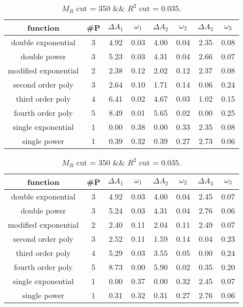  
\begin{table}[H] 
\begin{center} 
\begin{tabular}{|c|c|cc|cc|cc|} 
\hline function & \#P & $\Delta A_1$ & $\omega_1$ & $\Delta A_2$ & $\omega_2$ & $\Delta A_3$ & $\omega_3$ \\ \hline 
double exponential &  3 &   4.92 &   0.03 &   4.00 &   0.04 &   2.35 &   0.08 \\ 
double power &  3 &   5.23 &   0.03 &   4.31 &   0.04 &   2.66 &   0.07 \\ 
modified exponential &  2 &   2.38 &   0.12 &   2.02 &   0.12 &   2.37 &   0.08 \\ 
second order poly &  3 &   2.64 &   0.10 &   1.71 &   0.14 &   0.06 &   0.24 \\ 
third order poly &  4 &   6.41 &   0.02 &   4.67 &   0.03 &   1.02 &   0.15 \\ 
fourth order poly &  5 &   8.49 &   0.01 &   5.65 &   0.02 &   0.00 &   0.25 \\ 
single exponential &  1 &   0.00 &   0.38 &   0.00 &   0.33 &   2.35 &   0.08 \\ 
single power &  1 &   0.39 &   0.32 &   0.39 &   0.27 &   2.73 &   0.06 \\ 
\hline 
\end{tabular} 
\caption{$M_R$ cut = 350 \&\& $R^2$ cut = 0.035.} 
\label{tab:FitChoices_350_0.035} 
\end{center} 
\end{table} 
 
 
\begin{table}[H] 
\begin{center} 
\begin{tabular}{|c|c|cc|cc|cc|} 
\hline function & \#P & $\Delta A_1$ & $\omega_1$ & $\Delta A_2$ & $\omega_2$ & $\Delta A_3$ & $\omega_3$ \\ \hline 
double exponential &  3 &   4.92 &   0.03 &   4.00 &   0.04 &   2.45 &   0.07 \\ 
double power &  3 &   5.24 &   0.03 &   4.31 &   0.04 &   2.76 &   0.06 \\ 
modified exponential &  2 &   2.40 &   0.11 &   2.04 &   0.11 &   2.49 &   0.07 \\ 
second order poly &  3 &   2.52 &   0.11 &   1.59 &   0.14 &   0.04 &   0.23 \\ 
third order poly &  4 &   5.29 &   0.03 &   3.55 &   0.05 &   0.00 &   0.24 \\ 
fourth order poly &  5 &   8.73 &   0.00 &   5.90 &   0.02 &   0.35 &   0.20 \\ 
single exponential &  1 &   0.00 &   0.37 &   0.00 &   0.32 &   2.45 &   0.07 \\ 
single power &  1 &   0.31 &   0.32 &   0.31 &   0.27 &   2.76 &   0.06 \\ 
\hline 
\end{tabular} 
\caption{$M_R$ cut = 350 \&\& $R^2$ cut = 0.035.} 
\label{tab:FitChoices_350_0.035} 
\end{center} 
\end{table} 
 
